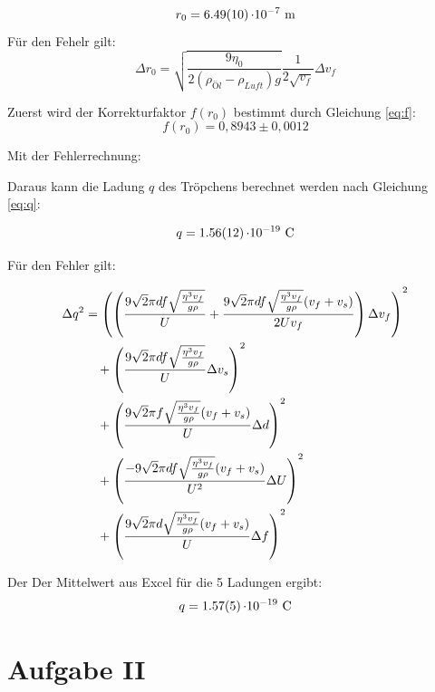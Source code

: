 \[r_0 = \SI{6,49 \pm 0,10}{\cdot 10^{-7}\ \meter} \]
Für den Fehelr gilt:
\begin{equation}
    \Delta r_0 = \sqrt{\frac{9 \eta_0}{2 (\rho_{Öl}- \rho_{Luft}) g}} \frac{1}{2 \sqrt{v_f}}\Delta v_f
\end{equation}

Zuerst wird der Korrekturfaktor $f(r_0)$ bestimmt durch Gleichung \ref{eq:f}:
\[f(r_0) = 0,8943 \pm 0,0012\]

Mit der Fehlerrechnung:

Daraus kann die Ladung $q$ des Tröpchens berechnet werden nach Gleichung \ref{eq:q}:

\[q = \SI{1,56 \pm 0.12}{\cdot 10^{-19}\ \coulomb}\]

Für den Fehler gilt:


\begin{align}
\Delta q^2 &= \left( \left(\frac{9\sqrt{2}\pi df \sqrt{\frac{\eta^{3}v_f}{g\rho}}}{U} + \frac{9\sqrt{2}\pi df \sqrt{\frac{\eta^{3}v_f}{g\rho}} (v_f+v_s)}{2U v_f}\right) \Delta v_f\right)^2 \notag\\ 
&\quad + \left(\frac{9\sqrt{2}\pi df \sqrt{\frac{\eta^{3}v_f}{g\rho}}}{U} \Delta v_s\right)^2 \notag\\
&\quad + \left(\frac{9\sqrt{2}\pi f \sqrt{\frac{\eta^{3}v_f}{g\rho}} (v_f+v_s)}{U} \Delta d\right)^2 \notag\\
&\quad + \left(\frac{-9\sqrt{2}\pi df \sqrt{\frac{\eta^{3}v_f}{g\rho}} (v_f+v_s)}{U^2} \Delta U\right)^2 \notag\\
&\quad + \left(\frac{9\sqrt{2}\pi d \sqrt{\frac{\eta^{3}v_f}{g\rho}} (v_f+v_s)}{U} \Delta f\right)^2
\end{align}

Der Der Mittelwert aus Excel für die 5 Ladungen ergibt:
\[q = \SI{1,57 \pm0,05}{\cdot 10^{-19}\ \coulomb}\]

\newpage
\section{Aufgabe II}

